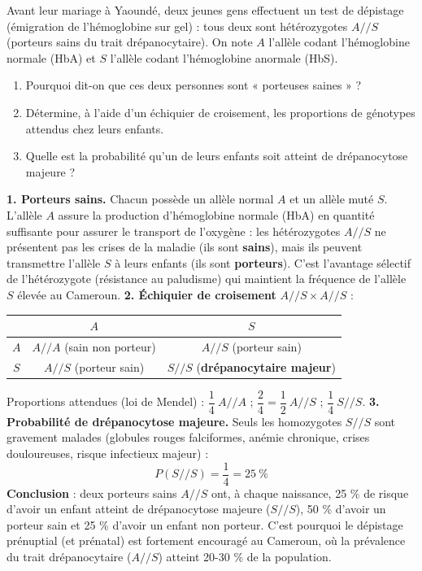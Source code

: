 \documentclass[11pt]{article}
\begin{document}
\begin{exoresolu}
Avant leur mariage à Yaoundé, deux jeunes gens effectuent un test de dépistage (émigration de l'hémoglobine sur gel) : tous deux sont hétérozygotes $A/\!/S$ (porteurs sains du trait drépanocytaire). On note $A$ l'allèle codant l'hémoglobine normale (HbA) et $S$ l'allèle codant l'hémoglobine anormale (HbS).
\begin{enumerate}
\item Pourquoi dit-on que ces deux personnes sont « porteuses saines » ?
\item Détermine, à l'aide d'un échiquier de croisement, les proportions de génotypes attendus chez leurs enfants.
\item Quelle est la probabilité qu'un de leurs enfants soit atteint de drépanocytose majeure ?
\end{enumerate}
\tcblower
\textbf{1. Porteurs sains.} Chacun possède un allèle normal $A$ et un allèle muté $S$. L'allèle $A$ assure la production d'hémoglobine normale (HbA) en quantité suffisante pour assurer le transport de l'oxygène : les hétérozygotes $A/\!/S$ ne présentent pas les crises de la maladie (ils sont \textbf{sains}), mais ils peuvent transmettre l'allèle $S$ à leurs enfants (ils sont \textbf{porteurs}). C'est l'avantage sélectif de l'hétérozygote (résistance au paludisme) qui maintient la fréquence de l'allèle $S$ élevée au Cameroun.
\textbf{2. Échiquier de croisement} $A/\!/S \times A/\!/S$ :
\begin{center}
\begin{tabular}{|c|c|c|}
\hline
\rowcolor{popblueL} & $A$ & $S$ \\
\hline
$A$ & $A/\!/A$ (sain non porteur) & $A/\!/S$ (porteur sain) \\
\hline
$S$ & $A/\!/S$ (porteur sain) & $S/\!/S$ (\textbf{drépanocytaire majeur}) \\
\hline
\end{tabular}
\end{center}
Proportions attendues (loi de Mendel) : $\dfrac{1}{4}\ A/\!/A$ ; $\dfrac{2}{4} = \dfrac{1}{2}\ A/\!/S$ ; $\dfrac{1}{4}\ S/\!/S$.
\textbf{3. Probabilité de drépanocytose majeure.} Seuls les homozygotes $S/\!/S$ sont gravement malades (globules rouges falciformes, anémie chronique, crises douloureuses, risque infectieux majeur) :
\[ P(S/\!/S) = \frac{1}{4} = 25\ \% \]
\textbf{Conclusion} : deux porteurs sains $A/\!/S$ ont, à chaque naissance, 25 \% de risque d'avoir un enfant atteint de drépanocytose majeure ($S/\!/S$), 50 \% d'avoir un porteur sain et 25 \% d'avoir un enfant non porteur. C'est pourquoi le dépistage prénuptial (et prénatal) est fortement encouragé au Cameroun, où la prévalence du trait drépanocytaire ($A/\!/S$) atteint 20-30 \% de la population.
\end{exoresolu}
\end{document}
